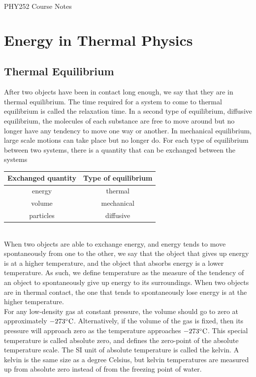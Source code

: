 \documentclass[11pt]{exam}
\begin{document}
\begin{center}
{\huge PHY252 Course Notes}
\end{center}
\section{Energy in Thermal Physics}
\subsection{Thermal Equilibrium}
\hspace*{10mm}After two objects have been in contact long enough, we say that they are in thermal equilibrium. The time required for a system to come to thermal equilibrium is called the relaxation time. In a second type of equilibrium, diffusive equilibrium, the molecules of each substance are free to move around but no longer have any tendency to move one way or another. In mechanical equilibrium, large scale motions can take place but no longer do. For each type of equilibrium between two systems, there is a quantity that can be exchanged between the systems 
\begin{table}[htp]
\centering
\begin{tabular}{cc} 
Exchanged quantity & Type of equilibrium \\ 
\hline
energy & thermal \\
volume & mechanical \\
particles & diffusive
\end{tabular}
\label{default}
\end{table}\\
\hspace*{10mm}When two objects are able to exchange energy, and energy tends to move spontaneously from one to the other, we say that the object that gives up energy is at a higher temperature, and the object that absorbs energy is a lower temperature. As such, we define temperature as the measure of the tendency of an object to spontaneously give up energy to its surroundings. When two objects are in thermal contact, the one that tends to spontaneously lose energy is at the higher temperature. \\
\hspace*{10mm}For any low-density gas at constant pressure, the volume should go to zero at approximately $-273\degree\text{C}$. Alternatively, if the volume of the gas is fixed, then its pressure will approach zero as the temperature approaches $-273\degree\text{C}$. This special temperature is called absolute zero, and defines the zero-point of the absolute temperature scale. The SI unit of absolute temperature is called the kelvin. A kelvin is the same size as a degree Celsius, but kelvin temperatures are measured up from absolute zero instead of from the freezing point of water. 
\newpage
\end{document}

